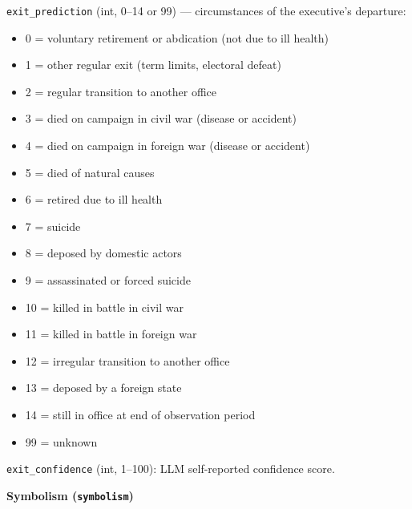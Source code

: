\documentclass[11pt, a4paper]{article}
\newenvironment{promptquote}{%
  \begin{quote}\small
}{%
  \end{quote}
}
\begin{document}
\texttt{exit\_prediction} (int, 0--14 or 99) --- circumstances of the executive's departure:
\begin{itemize}[nosep, leftmargin=1.7em]
  \item 0 = voluntary retirement or abdication (not due to ill health)
  \item 1 = other regular exit (term limits, electoral defeat)
  \item 2 = regular transition to another office
  \item 3 = died on campaign in civil war (disease or accident)
  \item 4 = died on campaign in foreign war (disease or accident)
  \item 5 = died of natural causes
  \item 6 = retired due to ill health
  \item 7 = suicide
  \item 8 = deposed by domestic actors
  \item 9 = assassinated or forced suicide
  \item 10 = killed in battle in civil war
  \item 11 = killed in battle in foreign war
  \item 12 = irregular transition to another office
  \item 13 = deposed by a foreign state
  \item 14 = still in office at end of observation period
  \item 99 = unknown
\end{itemize}
\texttt{exit\_confidence} (int, 1--100): LLM self-reported confidence score.

\bigskip
\textbf{Symbolism (\texttt{symbolism})}


\end{document}
